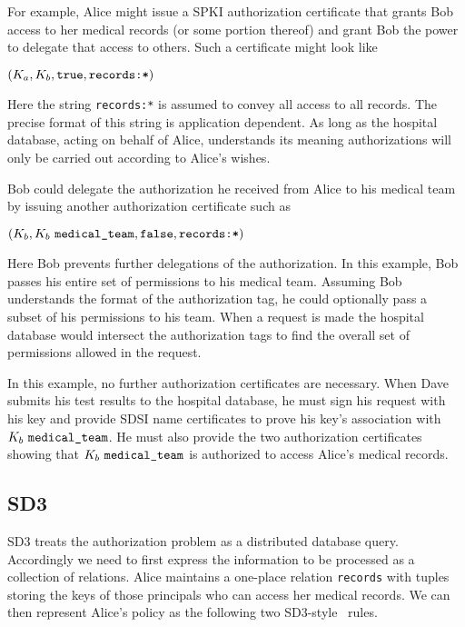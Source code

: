 \documentclass{article}
\begin{document}
For example, Alice might issue a SPKI authorization certificate that grants
Bob access to her medical records (or some portion thereof) and grant Bob
the power to delegate that access to others. Such a certificate might look
like

\vspace{1.5ex}
\centerline{$(K_a, K_b, \text{\tt true}, \text{\tt records:*})$}

Here the string \texttt{records:*} is assumed to convey all access to all
records. The precise format of this string is application dependent. As
long as the hospital database, acting on behalf of Alice, understands its
meaning authorizations will only be carried out according to Alice's
wishes.

Bob could delegate the authorization he received from Alice to his medical
team by issuing another authorization certificate such as

\vspace{1.5ex}
\centerline{$(K_b, K_b\,\,\text{\tt medical\_team}, \text{\tt false},
  \text{\tt records:*})$}

Here Bob prevents further delegations of the authorization. In this
example, Bob passes his entire set of permissions to his medical team.
Assuming Bob understands the format of the authorization tag, he could
optionally pass a subset of his permissions to his team. When a request is
made the hospital database would intersect the authorization tags to find
the overall set of permissions allowed in the request.

In this example, no further authorization certificates are necessary. When
Dave submits his test results to the hospital database, he must sign his
request with his key and provide SDSI name certificates to prove his key's
association with $K_b\,\,\text{\tt medical\_team}$. He must also provide
the two authorization certificates showing that $K_b\,\,\text{\tt
medical\_team}$ is authorized to access Alice's medical records.

\subsection{SD3}

SD3 treats the authorization problem as a distributed database query.
Accordingly we need to first express the information to be processed as a
collection of relations. Alice maintains a one-place relation
\texttt{records} with tuples storing the keys of those principals who can
access her medical records. We can then represent Alice's policy as the
following two SD3-style \datalog\ rules.
\end{document}
